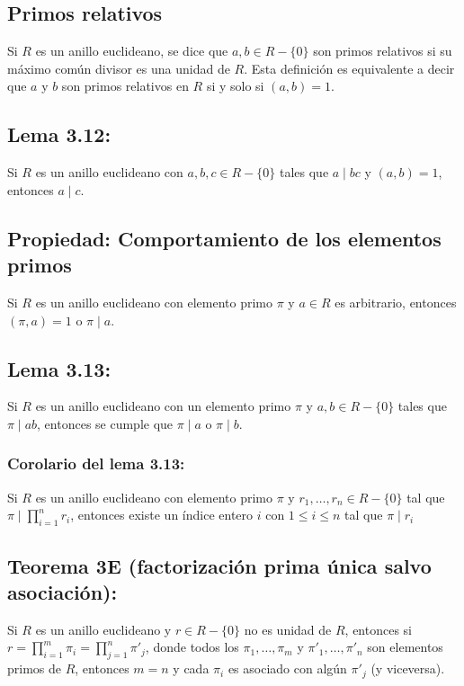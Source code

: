\documentclass{article}
\begin{document}
\subsection*{\color{violet} Primos relativos}

Si $R$ es un anillo euclideano, se dice que $a,b\in R-\{0\}$ son primos relativos si su máximo común divisor es una unidad de $R$. Esta definición es equivalente a decir que $a$ y $b$ son primos relativos en $R$ si y solo si $(a,b)=1$.

\subsection*{\color{blue} Lema 3.12:}

Si $R$ es un anillo euclideano con $a,b,c\in R-\{0\}$ tales que $a\mid bc$ y $(a,b)=1$, entonces $a\mid c$.

\subsection*{\color{purple} Propiedad: Comportamiento de los elementos primos}

Si $R$ es un anillo euclideano con elemento primo $\pi$ y $a\in R$ es arbitrario, entonces $(\pi,a)=1$ o $\pi\mid a$.

\subsection*{\color{blue} Lema 3.13:}

Si $R$ es un anillo euclideano con un elemento primo $\pi$ y $a,b\in R-\{0\}$ tales que $\pi\mid ab$, entonces se cumple que $\pi\mid a$ o $\pi\mid b$.

\subsubsection*{\color{blue} Corolario del lema 3.13:}

Si $R$ es un anillo euclideano con elemento primo $\pi$ y $r_1,\ldots,r_n\in R-\{0\}$ tal que $\pi\mid\displaystyle\prod_{i=1}^{n}r_i$, entonces existe un índice entero $i$ con $1\leq i\leq n$ tal que $\pi\mid r_i$

\subsection*{\color{red} Teorema 3E (factorización prima única salvo asociación):}

Si $R$ es un anillo euclideano y $r\in R-\{0\}$ no es unidad de $R$, entonces si $r=\displaystyle\prod_{i=1}^{m}\pi_i=\prod_{j=1}^{n}\pi'_j$, donde todos los $\pi_1,\ldots,\pi_m$ y $\pi'_1,\ldots,\pi'_n$ son elementos primos de $R$, entonces $m=n$ y cada $\pi_i$ es asociado con algún $\pi'_j$ (y viceversa).
\end{document}
